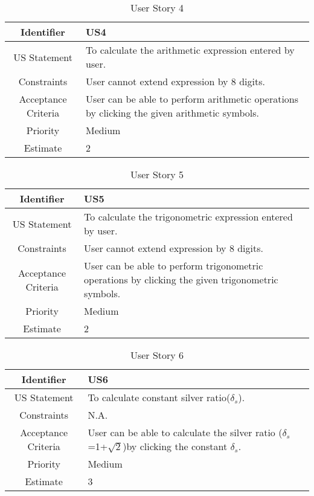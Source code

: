 \documentclass[12pt]{article}
\begin{document}
\begin{table}[h]
    \begin{tabular}{|c|p{14cm}|}
    \hline
      Identifier   & US4 \\
      \hline
       US Statement  & To calculate the arithmetic expression entered by user. \\
       \hline
       Constraints & User cannot extend expression by 8 digits.\\
       \hline
       Acceptance Criteria & User can be able to perform arithmetic operations by clicking the given arithmetic symbols. \\
       \hline
       Priority & Medium\\
       \hline
       Estimate & 2\\
       \hline
    \end{tabular}
    \caption{User Story 4}
\label{table:4}
\end{table}

\begin{table}[h]
    \begin{tabular}{|c|p{14cm}|}
    \hline
      Identifier   & US5 \\
      \hline
       US Statement  & To calculate the trigonometric expression entered by user. \\
       \hline
       Constraints & User cannot extend expression by 8 digits.\\
       \hline
       Acceptance Criteria & User can be able to perform trigonometric operations by clicking the given trigonometric symbols. \\
       \hline
       Priority & Medium\\
       \hline
       Estimate & 2\\
       \hline
    \end{tabular}
    \caption{User Story 5}
\label{table:5}
\end{table}

\begin{table}[h]
    \begin{tabular}{|c|p{14cm}|}
    \hline
      Identifier   & US6 \\
      \hline
       US Statement  & To calculate constant silver ratio($\delta_s$).  \\
       \hline
       Constraints & N.A. \\
       \hline
       Acceptance Criteria & User can be able to calculate the silver ratio ($\delta_s$=1+$\sqrt{2}$)by clicking the constant $\delta_s$.\\
       \hline
       Priority & Medium\\
       \hline
       Estimate & 3\\
       \hline
    \end{tabular}
    \caption{User Story 6}
\label{table:6}
\end{table}
\end{document}
